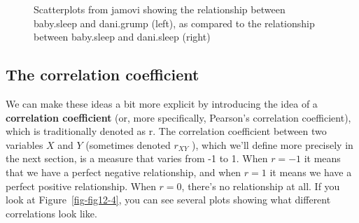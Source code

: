 \documentclass[
  a4paper,
]{book}
\begin{document}
\begin{figure}[h!]
\begin{minipage}[b]{0.50\linewidth}
{}

\subcaption{\label{fig-fig12-3b}}
\end{minipage}%

\caption{\label{fig-fig12-3}Scatterplots from jamovi showing the
relationship between baby.sleep and dani.grump (left), as compared to
the relationship between baby.sleep and dani.sleep (right)}

\end{figure}

\hypertarget{the-correlation-coefficient}{%
\subsection{The correlation
coefficient}\label{the-correlation-coefficient}}

We can make these ideas a bit more explicit by introducing the idea of a
\textbf{correlation coefficient} (or, more specifically, Pearson's
correlation coefficient), which is traditionally denoted as r. The
correlation coefficient between two variables \(X\) and \(Y\) (sometimes
denoted \(r_{XY}\) ), which we'll define more precisely in the next
section, is a measure that varies from -1 to 1. When \(r = -1\) it means
that we have a perfect negative relationship, and when \(r = 1\) it
means we have a perfect positive relationship. When \(r = 0\), there's
no relationship at all. If you look at Figure~\ref{fig-fig12-4}, you can
see several plots showing what different correlations look like.
\end{document}
